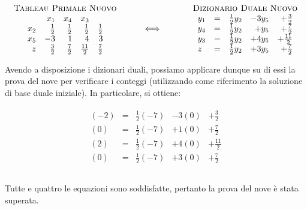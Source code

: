 \documentclass{article}
\begin{document}
  	\[
  	\begin{array}{c}
  	\mbox{\sc Tableau Primale Nuovo}\\
  	\begin{array}{rrrrr}
  	& x_1  & x_4 & x_3  \\
  	x_2 &  \frac{1}{2} &  \frac{1}{2} &  \frac{1}{2}   &  \frac{1}{2} \\
  	x_5 & -3 & 1 & 4 &  3 \\
  	z  & \frac{3}{2} & \frac{7}{2} &  \frac{11}{2}   &  \frac{7}{2} \\
  	\end{array}
  	\end{array}
  	\hfill
  	\hspace{1cm}
  	{\Huge \Longleftrightarrow}
  	\hfill
  	\hspace{1.2cm}
  	\begin{array}{c}
  	\mbox{\sc Dizionario Duale Nuovo}\\
  	\begin{array}{lcrrr}
  	y_{1} &=& \frac{1}{2}y_2 & -3y_5 & +\frac{3}{2} \\
  	y_{4} &=& \frac{1}{2}y_2 & +y_5 & +\frac{7}{2} \\
  	y_{3} &=& \frac{1}{2}y_2 & +4y_5 & +\frac{11}{2} \\
  	z &=& \frac{1}{2}y_2 & +3y_5 & +\frac{7}{2} \\
  	\end{array}
  	\end{array}
  	\]
  	
  	Avendo a disposizione i dizionari duali, possiamo applicare dunque su di essi la prova del nove per verificare i conteggi (utilizzando come riferimento la soluzione di base duale iniziale). In particolare, si ottiene:
  	
	\[
	\begin{array}{c}
	\begin{array}{lclll}
	(-2) &=& \frac{1}{2}(-7) & -3(0) & +\frac{3}{2} \\
	(0) &=& \frac{1}{2}(-7) & +1(0) & +\frac{7}{2} \\
	(2) &=& \frac{1}{2}(-7) & +4(0) & +\frac{11}{2} \\
	(0) &=& \frac{1}{2}(-7) & +3(0) & +\frac{7}{2} \\
	\end{array}\\		
	\end{array}
	\]
	
	Tutte e quattro le equazioni sono soddisfatte, pertanto la prova del nove è stata superata.
	
\end{document}
